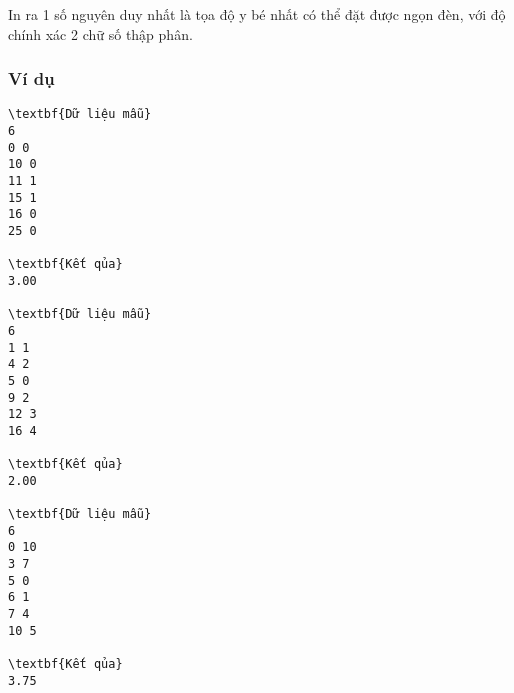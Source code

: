 In ra 1 số nguyên duy nhất là tọa độ y bé nhất có thể đặt được ngọn đèn, với độ chính xác 2 chữ số thập phân.

\subsubsection{Ví dụ}
\begin{verbatim}
\textbf{Dữ liệu mẫu}
6 
0 0 
10 0 
11 1 
15 1 
16 0 
25 0

\textbf{Kết qủa}
3.00

\textbf{Dữ liệu mẫu}
6
1 1
4 2
5 0
9 2
12 3
16 4

\textbf{Kết qủa}
2.00

\textbf{Dữ liệu mẫu}
6
0 10
3 7
5 0
6 1
7 4
10 5

\textbf{Kết qủa}
3.75
\end{verbatim}
